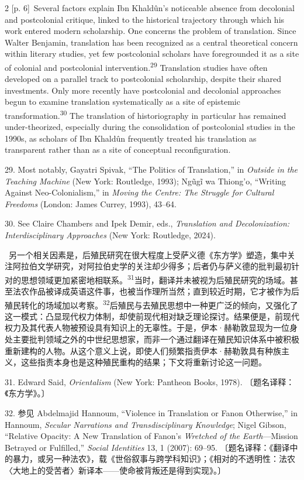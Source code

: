 \documentclass[10pt,a4paper]{article}
\begin{document}
\begin{paracol}{2}
\switchcolumn
{\scriptsize\color{gray} [p. 6]}\ Several factors explain Ibn Khaldûn’s noticeable absence from decolonial and postcolonial critique, linked to the historical trajectory through which his work entered modern scholarship. One concerns the problem of translation. Since Walter Benjamin, translation has been recognized as a central theoretical concern within literary studies, yet few postcolonial scholars have foregrounded it as a site of colonial and postcolonial intervention.\nobreak\textsuperscript{29} Translation studies have often developed on a parallel track to postcolonial scholarship, despite their shared investments. Only more recently have postcolonial and decolonial approaches begun to examine translation systematically as a site of epistemic transformation.\nobreak\textsuperscript{30} The translation of historiography in particular has remained under-theorized, especially during the consolidation of postcolonial studies in the 1990s, as scholars of Ibn Khaldûn frequently treated his translation as transparent rather than as a site of conceptual reconfiguration.\par{\small 29. Most notably, Gayatri Spivak, “The Politics of Translation,” in \textit{Outside in the Teaching Machine} (New York: Routledge, 1993); Ngũgĩ wa Thiong’o, “Writing Against Neo-Colonialism,” in \textit{Moving the Centre: The Struggle for Cultural Freedoms} (London: James Currey, 1993), 43–64.\par}{\small 30. See Claire Chambers and Ipek Demir, eds., \textit{Translation and Decolonization: Interdisciplinary Approaches} (New York: Routledge, 2024).\par}
\switchcolumn*
{\scriptsize\color{gray} [p. 7]}\ 另一个相关因素是，后殖民研究在很大程度上受萨义德《东方学》塑造，集中关注阿拉伯文学研究，对阿拉伯史学的关注却少得多；后者仍与萨义德的批判最初针对的思想领域更加紧密地相联\mbox{系。\textsuperscript{31}}当时，翻译并未被视为后殖民研究的场域。甚至法农作品被译成英语这件事，也被当作理所当然；直到较近时期，它才被作为后殖民转化的场域加以考\mbox{察。\textsuperscript{32}}后殖民与去殖民思想中一种更广泛的倾向，又强化了这一模式：凸显现代权力体制，却使前现代相对缺乏理论探讨。结果便是，前现代权力及其代表人物被预设具有知识上的无辜性。于是，伊本·赫勒敦显现为一位身处主要批判领域之外的中世纪思想家，而非一个通过翻译在殖民知识体系中被积极重新建构的人物。从这个意义上说，即使人们频繁指责伊本·赫勒敦具有种族主义，这些指责本身也是这种殖民重构的结果；下文将重新讨论这一问题。\par{\small 31. Edward Said, \textit{Orientalism} (New York: Pantheon Books, 1978). 〔题名译释：《东方学》。〕\par}{\small 32. 参见 Abdelmajid Hannoum, “Violence in Translation or Fanon Otherwise,” in Hannoum, \textit{Secular Narrations and Transdisciplinary Knowledge}; Nigel Gibson, “Relative Opacity: A New Translation of Fanon’s \textit{Wretched of the Earth}—Mission Betrayed or Fulfilled,” \textit{Social Identities} 13, 1 (2007): 69–95. 〔题名译释：《翻译中的暴力，或另一种法农》，载《世俗叙事与跨学科知识》；《相对的不透明性：法农〈大地上的受苦者〉新译本——使命被背叛还是得到实现》。〕\par}

\end{paracol}
\end{document}
